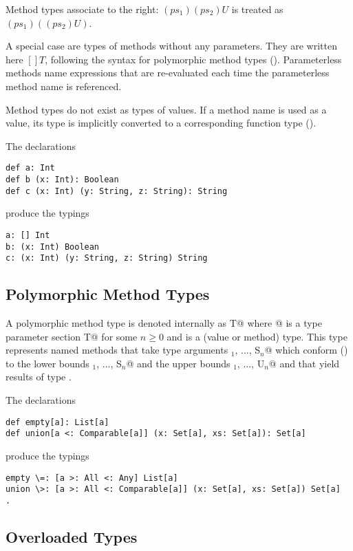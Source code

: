 \documentclass[11pt]{report}
\begin{document}
Method types associate to the right: $(ps_1)(ps_2)U$ is treated as
$(ps_1)((ps_2)U)$.

A special case are types of methods without any parameters. They are
written here $[]T$, following the syntax for polymorphic method types
(). Parameterless methods name expressions that
are re-evaluated each time the parameterless method name is
referenced.

Method types do not exist as types of values. If a method name is used
as a value, its type is implicitly converted to a corresponding
function type ().

\example The declarations
\begin{verbatim}
def a: Int
def b (x: Int): Boolean
def c (x: Int) (y: String, z: String): String
\end{verbatim}
produce the typings
\begin{verbatim}
a: [] Int
b: (x: Int) Boolean
c: (x: Int) (y: String, z: String) String
\end{verbatim}

\subsection{Polymorphic Method Types}
\label{sec:poly-types}

A polymorphic method type is denoted internally as \verb@[tps]T@ where
\verb@[tps]@ is a type parameter section 
\verb@[a$_1$ <: L$_1$ >: U$_1$, ..., a$_n$ <: L$_n$ >: U$_n$] T@ 
for some $n \geq 0$ and \verb@T@ is a
(value or method) type.  This type represents named methods that
take type arguments \verb@S$_1$, ..., S$_n$@ which
conform () to the lower bounds
\verb@S$_1$, ..., S$_n$@ and the upper bounds
\verb@U$_1$, ..., U$_n$@ and that yield results of type \verb@T@.

\example The declarations
\begin{verbatim}
def empty[a]: List[a]
def union[a <: Comparable[a]] (x: Set[a], xs: Set[a]): Set[a]
\end{verbatim}
produce the typings
\begin{verbatim}
empty \=: [a >: All <: Any] List[a]
union \>: [a >: All <: Comparable[a]] (x: Set[a], xs: Set[a]) Set[a]  .
\end{verbatim}

\subsection{Overloaded Types}
\label{sec:overloaded-types}
\newcommand{\overload}{\la\mbox{\sf and}\ra}
\end{document}
